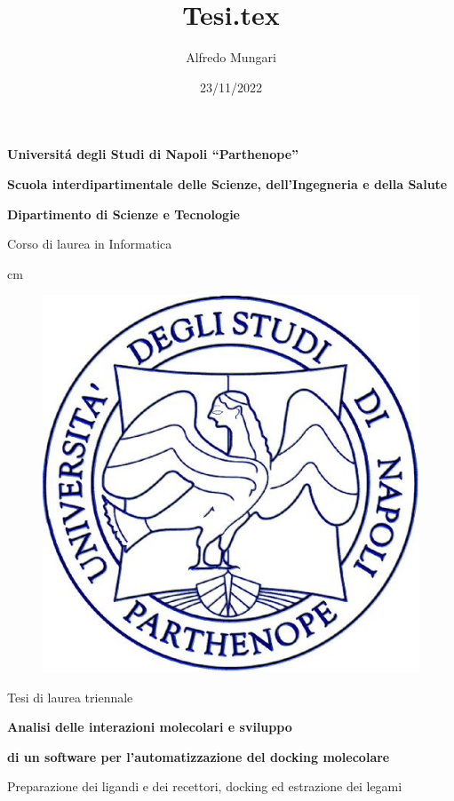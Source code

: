 \documentclass[12pt,a4paper,oneside,openright]{book}
\title{Tesi.tex}
\author{Alfredo Mungari}
\date{23/11/2022}
\begin{document}
    \baselineskip 1.5cm 

    \thispagestyle{empty}

    \vskip 1cm 

    \large \centerline{\bf Universit\'a degli Studi di Napoli ``Parthenope''}
    \centerline{\bf Scuola interdipartimentale delle Scienze, dell'Ingegneria e della Salute}
    \centerline{\bf Dipartimento di Scienze e Tecnologie}

    \centerline{\small Corso di laurea in Informatica}

     cm

    \begin{figure}[H]
        \centering
        \includegraphics[scale=0.30]{immagini/logoParthenope.png}
        \label{fig:logoParthenope}
    \end{figure}

    \vskip 0.5cm

    \large \centerline {Tesi di laurea triennale}

    \vskip 0.5cm

    \Large \centerline {\bf Analisi delle interazioni molecolari e sviluppo }
    \Large \centerline {\bf di un software per l'automatizzazione del docking molecolare}

    \centerline {\small Preparazione dei ligandi e dei recettori, docking ed estrazione dei legami}
\end{document}
